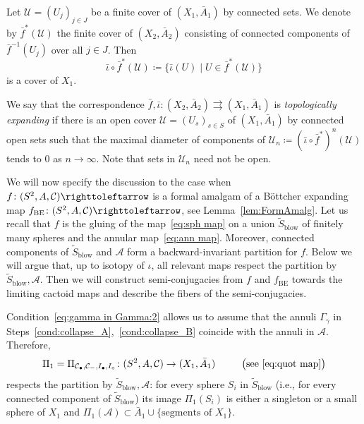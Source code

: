 \documentclass{amsart}
\theoremstyle{plain}
\theoremstyle{definition}
\theoremstyle{remark}
\renewcommand{\AA}{{\mathcal A}}
\newcommand{\blowup}{{\operatorname{blow}}}
\newcommand{\reminder}[1]{\textsl{$\lhd\rhd$#1$\lhd\rhd$}\marginpar{$\lhd\rhd\lhd\rhd\lhd\rhd$}}%
\newcommand{\hide}[1]{}
\renewcommand{\sp}{{\ \ }}
\newcommand{\UU}{{\mathcal U}}
\newcommand{\CC}{{\mathcal C}}
\newcommand\selfmap{\righttoleftarrow}
\begin{document}
Let $\UU=(U_j)_{j\in J}$ be a finite cover of $(X_1,\bar A_1)$ by connected sets. We denote by $\bar f^*(\UU)$ the finite cover of $(X_2,\bar A_2)$ consisting of connected components of $\bar f^{-1}(U_j)$ over all $j\in J$. Then \[\bar \iota\circ \bar f^*(\UU)\coloneq \{\bar \iota(U)\mid U\in \bar f^*(\UU)\}\]
is a cover of $X_1$.

We say that the correspondence $\bar f,\bar \iota\colon (X_2,\bar A_2)\rightrightarrows (X_1,\bar A_1)$ is \emph{topologically expanding} if there is an open cover $\UU=(U_s)_{s\in S}$ of $(X_1,\bar A_1)$ by connected open sets such that the maximal diameter of components of $\UU_n\coloneq (\bar \iota \circ \bar f^*)^n(\UU)$ tends to $0$ as $n\to \infty$. Note that sets in $\UU_n$ need not be open.





We will now specify the discussion to the case when $f\colon(S^2,A,\CC)\selfmap$ is a formal amalgam of a B\"ottcher expanding map $f_{\text{BE}}\colon(S^2,A,\CC)\selfmap$, see Lemma~\ref{lem:FormAmalg}. Let us recall that $f$ is the gluing of the map~\eqref{eq:sph map} on a union $\widetilde S_\blowup$ of finitely many spheres and the annular map~\eqref{eq:ann map}. Moreover, connected components of $\widetilde S_\blowup$ and $\AA$ form a backward-invariant partition for $f$. Below we will argue that, up to isotopy of $\iota$, all relevant maps respect the partition by $\widetilde S_\blowup,\AA$. Then we will construct semi-conjugacies from $f$ and $f_\text{BE}$ towards the limiting cactoid maps and describe the fibers of the semi-conjugacies.  


Condition~\eqref{eq:gamma in Gamma:2} allows us to assume that the annuli $\Gamma_\gamma$ in Steps~\ref{cond:collapse_A},~\ref{cond:collapse_B} coincide with the annuli in $\AA$. Therefore,
\[\Pi_1=\Pi_{\CC_\bullet, \CC_- , I_\bullet,I_\circ}\colon  (S^2,A,\CC) \to (X_1,\bar A_1) \sp\sp\sp\sp  \big(\text{see~\eqref{eq:quot map}}\big)\] 
respects the partition by $\widetilde S_\blowup,\AA$: for every sphere $S_i$ in $\widetilde S_\blowup$ (i.e., for every connected component of $\widetilde S_\blowup$) its image $\Pi_1(S_i)$ is either a singleton or a small sphere of $X_1$ and $\Pi_1(\AA)\subset \bar A_1\cup \{\text{segments of $X_1$}\}$.
\end{document}
